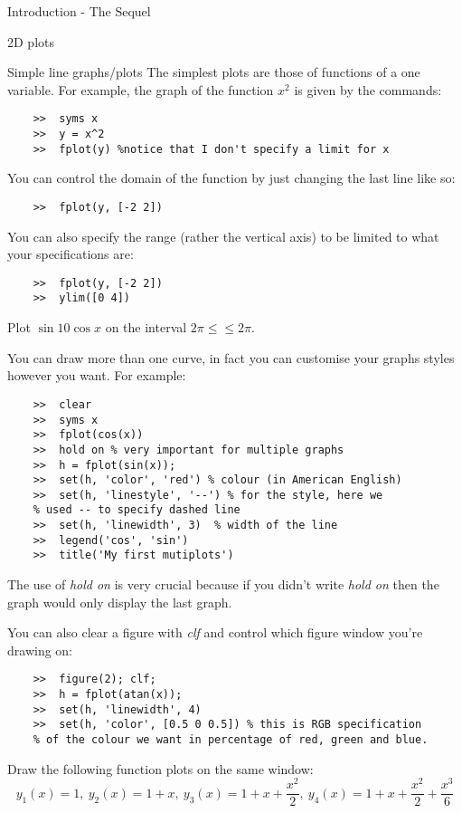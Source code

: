 \documentclass[11pt, oneside]{report}   	%
\begin{document}
\begin{chapter}{Introduction - The Sequel}
\begin{Exercise}
\end{Exercise}

\begin{section}{2D plots}
\begin{subsection}{Simple line graphs/plots}
The simplest plots are those of functions of a one variable. For example, the graph of the function $x^2$ is given by
the commands:

\begin{lstlisting}
	>>	syms x
	>>	y = x^2
	>>	fplot(y) %notice that I don't specify a limit for x
\end{lstlisting}
You can control the domain of the function by just changing the last line like so:
\begin{lstlisting}
	>>	fplot(y, [-2 2])
\end{lstlisting}
You can also specify the range (rather the vertical axis) to be limited to what your specifications are:

\begin{lstlisting}
	>>	fplot(y, [-2 2])
	>>	ylim([0 4])
\end{lstlisting}

\begin{Exercise}
Plot $\sin{10\cos{x}}$ on the interval $2\pi \leq \leq 2\pi$.
\end{Exercise}

You can draw more than one curve, in fact you can customise your graphs styles however you want. For example:

\begin{lstlisting}
	>>	clear
	>>	syms x
	>>	fplot(cos(x))
	>>	hold on % very important for multiple graphs
	>>	h = fplot(sin(x));
	>>	set(h, 'color', 'red') % colour (in American English)
	>>	set(h, 'linestyle', '--') % for the style, here we
	% used -- to specify dashed line
	>>	set(h, 'linewidth', 3)  % width of the line
	>>	legend('cos', 'sin')
	>>	title('My first mutiplots')
\end{lstlisting}

The use of \textit{hold on} is very crucial because if you didn't write \textit{hold on} then the graph would only
display the last graph. 

You can also clear a figure with \textit{clf} and control which figure window you're drawing on:

\begin{lstlisting}
	>>	figure(2); clf;
	>>	h = fplot(atan(x));
	>>	set(h, 'linewidth', 4)
	>>	set(h, 'color', [0.5 0 0.5]) % this is RGB specification
	% of the colour we want in percentage of red, green and blue.
\end{lstlisting}
\begin{Exercise}
Draw the following function plots on the same window:
\[ y_1(x) = 1, \ y_2(x) = 1+x,\ y_3(x) = 1 + x + \frac{x^2}{2},\ y_4(x) = 1 + x + \frac{x^2}{2} + \frac{x^3}{6} \]
\end{Exercise}


\end{subsection}
\end{section}
\end{chapter}
\end{document}
